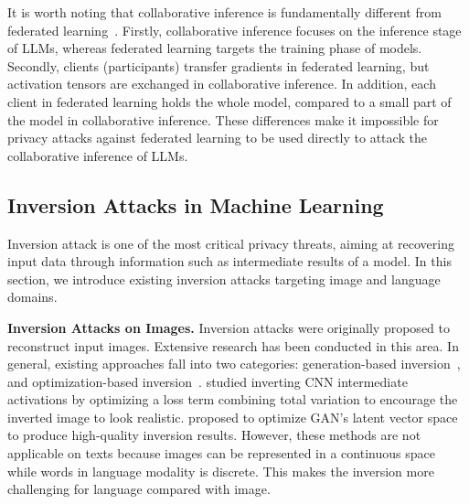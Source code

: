 It is worth noting that collaborative inference is fundamentally different from federated learning~\cite{zhang2021survey}. Firstly, collaborative inference focuses on the inference stage of LLMs, whereas federated learning targets the training phase of models. Secondly, clients (participants) transfer gradients in federated learning, but activation tensors are exchanged in collaborative inference. In addition, each client in federated learning holds the whole model, compared to a small part of the model in collaborative inference. These differences make it impossible for privacy attacks against federated learning to be used directly to attack the collaborative inference of LLMs.








\subsection{Inversion Attacks in Machine Learning}
\label{sec:inversion}
Inversion attack is one of the most critical privacy threats, aiming at recovering input data through information such as intermediate results of a model. In this section, we introduce existing inversion attacks targeting image and language domains.



\noindent \textbf{Inversion Attacks on Images.} Inversion attacks were originally proposed to reconstruct input images. Extensive research has been conducted in this area. In general, existing approaches fall into two categories: generation-based inversion~\cite{yang2019neural,tan2021many,khosravy2022model,yin2023ginver}, and optimization-based inversion~\cite{mahendran2015understanding,he2019model,attacking-and-protect-data-privacy,zhang2020secret,struppek2022plug}. 
\cite{he2019model} studied inverting CNN intermediate activations by optimizing a loss term combining total variation to encourage the inverted image to look realistic. 
\cite{zhang2020secret} proposed to optimize GAN's latent vector space to produce high-quality inversion results. 
However, these methods are not applicable on texts because images can be represented in a continuous space while words in language modality is discrete. This makes the inversion more challenging for language compared with image.




